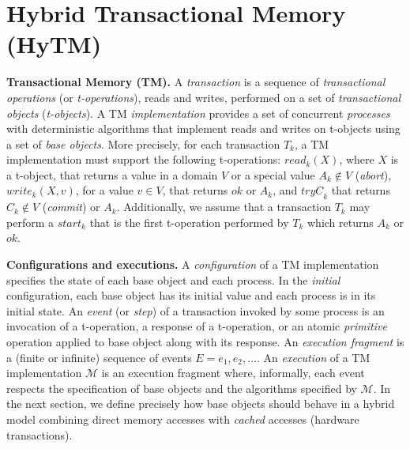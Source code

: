 \section{Hybrid Transactional Memory (HyTM)}
\label{sec:hytm}
%
\vspace{1mm}\noindent\textbf{Transactional Memory (TM).} 
A \emph{transaction} is a sequence of \emph{transactional operations}
(or \emph{t-operations}), reads and writes, performed on a set of \emph{transactional objects} 
(\emph{t-objects}). 
A TM \emph{implementation} provides a set of
concurrent \emph{processes} with deterministic algorithms that implement reads and
writes on t-objects using  a set of \emph{base objects}.
More precisely, for each transaction $T_k$, a TM implementation must support the following t-operations: 
$\mathit{read}_k(X)$, where $X$ is a t-object, that returns a value in
a domain $V$
or a special value $A_k\notin V$ (\emph{abort}),
$\mathit{write}_k(X,v)$, for a value $v \in V$,
that returns $\mathit{ok}$ or $A_k$, and
$\mathit{tryC}_k$ that returns $C_k\notin V$ (\emph{commit}) or $A_k$.
Additionally, we assume that a transaction $T_k$
may perform a $\mathit{start_k}$ that is the first t-operation performed by $T_k$ which returns $A_k$ or $\mathit{ok}$.

\vspace{1mm}\noindent\textbf{Configurations and executions.} 
A \emph{configuration} of a TM implementation specifies the state of each base object and each process. 
In the \emph{initial} configuration, each base object has its initial value and each process is in its initial state. 
An \emph{event} (or \emph{step}) of a transaction invoked by some process is an invocation of a t-operation, 
a response of a t-operation, or an atomic \emph{primitive} operation applied to base object along with its response. 
An \emph{execution fragment} is a (finite or infinite) sequence of events $E = e_1,e_2,\dots$. 
An \emph{execution} of a TM implementation $\mathcal{M}$ is an
execution fragment where, informally, each event respects the
specification of base objects and the algorithms specified by $\mathcal{M}$.
In the next section, we define precisely how base objects should
behave in a hybrid model combining direct memory accesses with \emph{cached} accesses (hardware
transactions).

